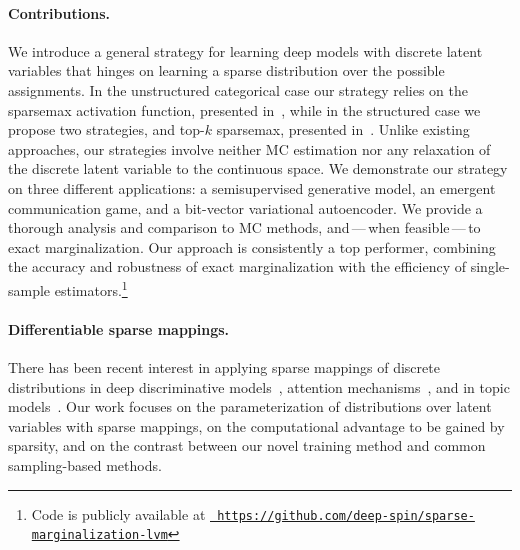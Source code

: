\paragraph*{Contributions.} We introduce a general strategy for
learning deep models with discrete latent variables that hinges on
learning a sparse distribution over the possible assignments. In the
unstructured categorical case our strategy relies on the sparsemax
activation function, presented in~, while in the
structured case we propose two strategies, \smap and top-$k$
sparsemax, presented in~. Unlike existing
approaches, our strategies involve neither MC estimation nor any
relaxation of the discrete latent variable to the continuous space.
We demonstrate our strategy on three different applications: a
semisupervised generative model, an emergent communication game, and
a bit-vector variational autoencoder. We provide a thorough analysis
and comparison to MC methods, and\,---\,when feasible\,---\,to exact
marginalization. Our approach is consistently a top performer,
combining the accuracy and robustness of exact marginalization with
the efficiency of single-sample estimators.\footnote{Code is publicly
    available at
    \href{https://github.com/deep-spin/sparse-marginalization-lvm}{\tt
        https://github.com/deep-spin/sparse-marginalization-lvm}}

\paragraph*{Differentiable sparse mappings.} There has been recent
interest in applying sparse mappings of discrete distributions in
deep discriminative models~\citep{martins2016softmax,
    niculae2018sparsemap, fusedmax, entmax, sparsemapcg}, attention
mechanisms~\citep{malaviya2018sparse, shao2019ssn,
    maruf2019selective, correia2019adaptively}, and in topic
models~\citep{caothesis}. Our work focuses on the parameterization of
distributions over latent variables with sparse mappings, on the
computational advantage to be gained by sparsity, and on the contrast
between our novel training method and common sampling-based methods.

